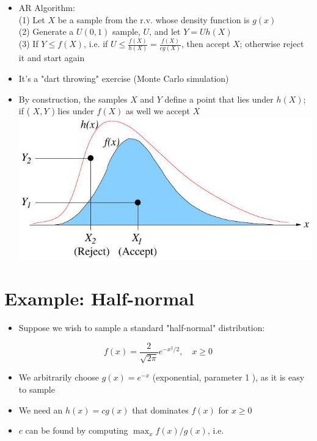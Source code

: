 \documentclass[10pt]{article}
\begin{document}
\begin{itemize}
  \item AR Algorithm:\\
(1) Let $X$ be a sample from the r.v. whose density function is $g(x)$\\
(2) Generate a $U(0,1)$ sample, $U$, and let $Y=U h(X)$\\
(3) If $Y \leq f(X)$, i.e. if $U \leq \frac{f(X)}{h(X)}=\frac{f(X)}{c g(X)}$, then accept $X$; otherwise reject it and start again
  \item It's a "dart throwing" exercise (Monte Carlo simulation)
  \item By construction, the samples $X$ and $Y$ define a point that lies under $h(X)$; if ( $X, Y$ ) lies under $f(X)$ as well we accept $X$\\
\includegraphics[max width=\textwidth, center]{2025_05_12_520db7cd238ba7b44f0fg-39}
\end{itemize}

\section*{Example: Half-normal}
\begin{itemize}
  \item Suppose we wish to sample a standard "half-normal" distribution:
\end{itemize}

$$
f(x)=\frac{2}{\sqrt{2 \pi}} e^{-x^{2} / 2}, \quad x \geq 0
$$

\begin{itemize}
  \item We arbitrarily choose $g(x)=e^{-x}$ (exponential, parameter 1 ), as it is easy to sample
  \item We need an $h(x)=c g(x)$ that dominates $f(x)$ for $x \geq 0$
  \item $c$ can be found by computing $\max _{x} f(x) / g(x)$, i.e.
\end{itemize}
\end{document}
